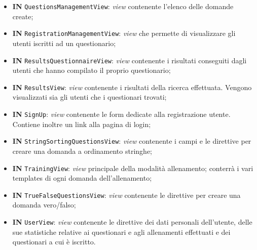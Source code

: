 \begin{itemize}
\begin{itemize}
			\item \textbf{IN} \texttt{QuestionsManagementView}: \textit{view} contenente l'elenco delle domande create; 
			\item \textbf{IN} \texttt{RegistrationManagementView}: \textit{view} che permette di visualizzare gli utenti iscritti ad un questionario;
			\item \textbf{IN} \texttt{ResultsQuestionnaireView}: \textit{view} contenente i risultati conseguiti dagli utenti che hanno compilato il proprio questionario;
			\item \textbf{IN} \texttt{ResultsView}: \textit{view} contenente i risultati della ricerca effettuata. Vengono visualizzati sia gli utenti che i questionari trovati;
			\item \textbf{IN} \texttt{SignUp}:  \textit{view} contenente le form dedicate alla registrazione utente. Contiene inoltre un link alla pagina di login;
			\item \textbf{IN} \texttt{StringSortingQuestionsView}:  \textit{view} contenente i campi e le direttive per creare una domanda a ordinamento stringhe; 
			\item \textbf{IN} \texttt{TrainingView}: \textit{view} principale della modalità allenamento; conterrà i vari templates di ogni domanda dell'allenamento;
			\item \textbf{IN} \texttt{TrueFalseQuestionsView}: \textit{view} contenente le direttive per creare una domanda vero/falso;
			\item \textbf{IN} \texttt{UserView}:  \textit{view} contenente le direttive dei dati personali dell'utente, delle sue statistiche relative ai questionari e agli allenamenti effettuati e dei questionari a cui è iscritto.
		\end{itemize}
	\end{itemize}
